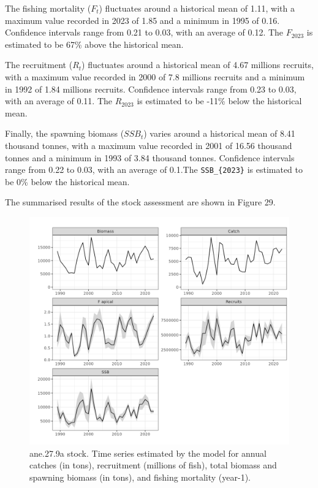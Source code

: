 \documentclass[
]{article}
\begin{document}
The fishing mortality (\(F_t\)) fluctuates around a historical mean of
1.11, with a maximum value recorded in 2023 of 1.85 and a minimum in
1995 of 0.16. Confidence intervals range from 0.21 to 0.03, with an
average of 0.12. The \(F_{2023}\) is estimated to be 67\% above the
historical mean.

The recruitment (\(R_t\)) fluctuates around a historical mean of 4.67
millions recruits, with a maximum value recorded in 2000 of 7.8 millions
recruits and a minimum in 1992 of 1.84 millions recruits. Confidence
intervals range from 0.23 to 0.03, with an average of 0.11. The
\(R_{2023}\) is estimated to be -11\% below the historical mean.

Finally, the spawning biomass (\(SSB_{t}\)) varies around a historical
mean of 8.41 thousand tonnes, with a maximum value recorded in 2001 of
16.56 thousand tonnes and a minimum in 1993 of 3.84 thousand tonnes.
Confidence intervals range from 0.22 to 0.03, with an average of 0.1.The
\texttt{SSB\_\{2023\}} is estimated to be 0\% below the historical mean.

The summarised results of the stock assessment are shown in Figure 29.

\begin{figure}[H]

{\centering \includegraphics[width=0.95\linewidth]{report/run/S1.0_4FLEETS/fig_time_series} 

}

\caption{ane.27.9a stock. Time series estimated by the model for annual catches (in tons), recruitment (millions of fish), total biomass and spawning biomass (in tons), and fishing mortality (year-1).}\label{fig:unnamed-chunk-38}
\end{figure}
\end{document}

